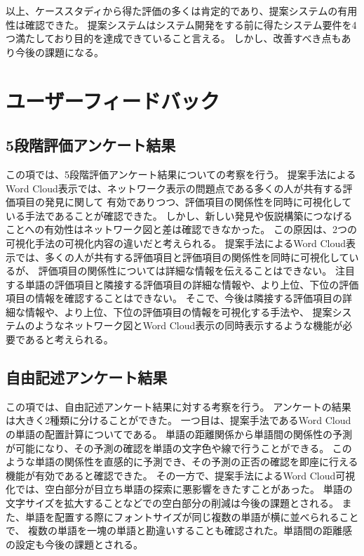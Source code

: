 \documentclass[syuuron]{kuee}
\begin{document}
		以上、ケーススタディから得た評価の多くは肯定的であり、提案システムの有用性は確認できた。
		提案システムはシステム開発をする前に得たシステム要件を4つ満たしており目的を達成できていること言える。
		しかし、改善すべき点もあり今後の課題になる。
		
	\section{ユーザーフィードバック}
		\subsection{5段階評価アンケート結果}
		この項では、5段階評価アンケート結果についての考察を行う。
		提案手法によるWord Cloud表示では、ネットワーク表示の問題点である多くの人が共有する評価項目の発見に関して
		有効でありつつ、評価項目の関係性を同時に可視化している手法であることが確認できた。
		しかし、新しい発見や仮説構築につなげることへの有効性はネットワーク図と差は確認できなかった。
		この原因は、2つの可視化手法の可視化内容の違いだと考えられる。
		提案手法によるWord Cloud表示では、多くの人が共有する評価項目と評価項目の関係性を同時に可視化しているが、
		評価項目の関係性については詳細な情報を伝えることはできない。
		注目する単語の評価項目と隣接する評価項目の詳細な情報や、より上位、下位の評価項目の情報を確認することはできない。
		そこで、今後は隣接する評価項目の詳細な情報や、より上位、下位の評価項目の情報を可視化する手法や、
		提案システムのようなネットワーク図とWord Cloud表示の同時表示するような機能が必要であると考えられる。
		
		\subsection{自由記述アンケート結果}
		この項では、自由記述アンケート結果に対する考察を行う。
		アンケートの結果は大きく2種類に分けることができた。
		一つ目は、提案手法であるWord Cloudの単語の配置計算についてである。
		単語の距離関係から単語間の関係性の予測が可能になり、その予測の確認を単語の文字色や線で行うことができる。
		このような単語の関係性を直感的に予測でき、その予測の正否の確認を即座に行える機能が有効であると確認できた。
		その一方で、提案手法によるWord Cloud可視化では、空白部分が目立ち単語の探索に悪影響をきたすことがあった。
		単語の文字サイズを拡大することなどでの空白部分の削減は今後の課題とされる。
		また、単語を配置する際にフォントサイズが同じ複数の単語が横に並べられることで、
		複数の単語を一塊の単語と勘違いすることも確認された。単語間の距離感の設定も今後の課題とされる。
	
\end{document}
